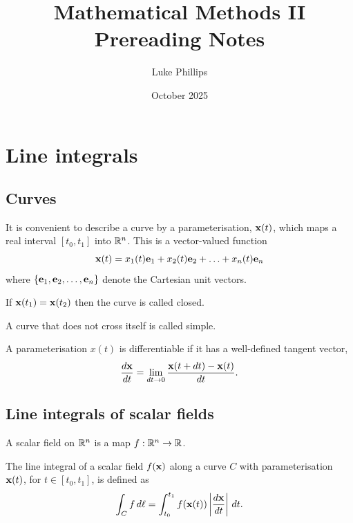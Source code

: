 \documentclass[10pt, a4paper]{article}
\title{Mathematical Methods II \\
    \large Prereading Notes}
\author{Luke Phillips}
\date{October 2025}
\begin{document}
\maketitle

\newpage

\tableofcontents

\newpage

\section{Line integrals}

\subsection{Curves}
It is convenient to describe a curve by a parameterisation,
$\mathbf{x}(t)$,
which maps a real interval $[t_0, t_1]$ into $\mathbb{R} ^ n$.
This is a vector-valued function
\[
\mathbf{x}(t) = x_1(t)\mathbf{e}_1 + x_2(t)\mathbf{e}_2 + \dotsc + x_n(t)\mathbf{e}_n
\]
where $\{\mathbf{e}_1, \mathbf{e}_2, \dotsc, \mathbf{e}_n\}$ denote the Cartesian unit vectors.

If $\mathbf{x}(t_1) = \mathbf{x}(t_2)$ then the curve is called closed.

A curve that does not cross itself is called simple.

A parameterisation $x(t)$ is differentiable if it has a well-defined tangent vector,
\[
\frac{d\mathbf{x}}{dt} = \lim_{dt \to 0}\frac{\mathbf{x}(t + dt) - \mathbf{x}(t)}{dt}.
\]

\subsection{Line integrals of scalar fields}
A scalar field on $\mathbb{R} ^ n$ is a map $f : \mathbb{R} ^ n \to \mathbb{R}$.

The line integral of a scalar field $f(\mathbf{x})$ along a curve $C$ with parameterisation $\mathbf{x}(t)$,
for $t \in [t_0, t_1]$,
is defined as
\[
\int_{C}f\,d\ell = \int_{t_0}^{t_1}f(\mathbf{x}(t))\left|\frac{d\mathbf{x}}{dt}\right|\,dt.
\]
\end{document}
